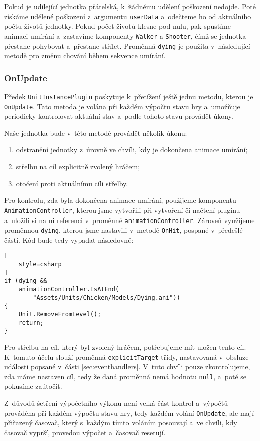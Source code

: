 Pokud je udílející jednotka přátelská, k~žádnému udělení poškození nedojde. Poté získáme udělené poškození z~argumentu \texttt{userData} a~odečteme ho od aktuálního počtu životů jednotky. Pokud počet životů klesne pod nulu, pak spustíme animaci umírání a~zastavíme komponenty \texttt{Walker} a \texttt{Shooter}, čímž se jednotka přestane pohybovat a~přestane střílet. Proměnná \texttt{dying} je použita v~následující metodě pro změnu chování během sekvence umírání.

\subsubsection{OnUpdate}
Předek \texttt{UnitInstancePlugin} poskytuje k~přetížení ještě jednu metodu, kterou je \texttt{OnUpdate}. Tato metoda je volána při každém výpočtu stavu hry a~umožňuje periodicky kontrolovat aktuální stav a~podle tohoto stavu provádět úkony.

Naše jednotka bude v~této metodě provádět několik úkonu:
\begin{enumerate}
	\item odstranění jednotky z~úrovně ve chvíli, kdy je dokončena animace umírání;
	\item střelbu na cíl explicitně zvolený hráčem;
	\item otočení proti aktuálnímu cíli střelby.
\end{enumerate}

Pro kontrolu, zda byla dokončena animace umírání, použijeme komponentu \texttt{AnimationController}, kterou jsme vytvořili při vytvoření či načtení pluginu a~uložili si na ni referenci v~proměnné \texttt{animationController}. Zároveň využijeme proměnnou \texttt{dying}, kterou jsme nastavili v~metodě \texttt{OnHit}, pospané v~předešlé části. Kód bude tedy vypadat následovně:

\begin{lstlisting}[
	style=csharp
]
if (dying && 
	animationController.IsAtEnd(
		"Assets/Units/Chicken/Models/Dying.ani")) 
{
	Unit.RemoveFromLevel();
	return;
}
\end{lstlisting}

Pro střelbu na cíl, který byl zvolený hráčem, potřebujeme mít uložen tento cíl. K~tomuto účelu slouží proměnná \texttt{explicitTarget} třídy, nastavovaná v~obsluze události popsané v~části \ref{sec:eventhandlers}. V~tuto chvíli pouze zkontrolujeme, zda máme nastaven cíl, tedy že daná proměnná nemá hodnotu \texttt{null}, a~poté se pokusíme zaútočit.

Z~důvodů šetření výpočetního výkonu není velká část kontrol a~výpočtů prováděna při každém výpočtu stavu hry, tedy každém volání \texttt{OnUpdate}, ale mají přiřazený časovač, který s~každým tímto voláním posouvají a~ve chvíli, kdy časovač vyprší, provedou výpočet a~časovač resetují.

